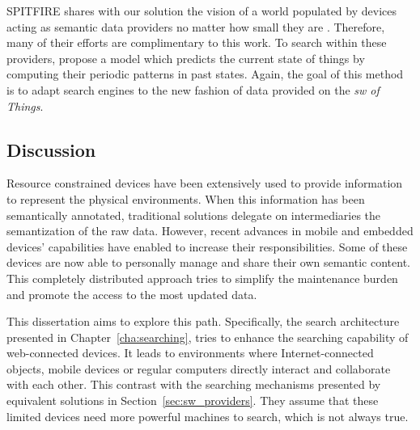 SPITFIRE shares with our solution the vision of a world populated by devices acting as semantic data providers no matter how small they are \citep{hasemann_rdf_2012}.
Therefore, many of their efforts are complimentary to this work.
To search within these providers, \citet{pfisterer_spitfire:_2011} propose a model which predicts the current state of things by computing their periodic patterns in past states.
Again, the goal of this method is to adapt search engines to the new fashion of data provided on the \emph{\acl{sw} of Things}.


\subsection{Discussion}

Resource constrained devices have been extensively used to provide information to represent the physical environments.
When this information has been semantically annotated, traditional solutions delegate on intermediaries the semantization of the raw data.
However, recent advances in mobile and embedded devices' capabilities have enabled to increase their responsibilities.
Some of these devices are now able to personally manage and share their own semantic content.
This completely distributed approach tries to simplify the maintenance burden and promote the access to the most updated data.


This dissertation aims to explore this path.
Specifically, the search architecture presented in Chapter~\ref{cha:searching}, tries to enhance the searching capability of web-connected devices.
It leads to environments where Internet-connected objects, mobile devices or regular computers directly interact and collaborate with each other. %
This contrast with the searching mechanisms presented by equivalent solutions in Section~\ref{sec:sw_providers}.
They assume that these limited devices need more powerful machines to search, which is not always true. %